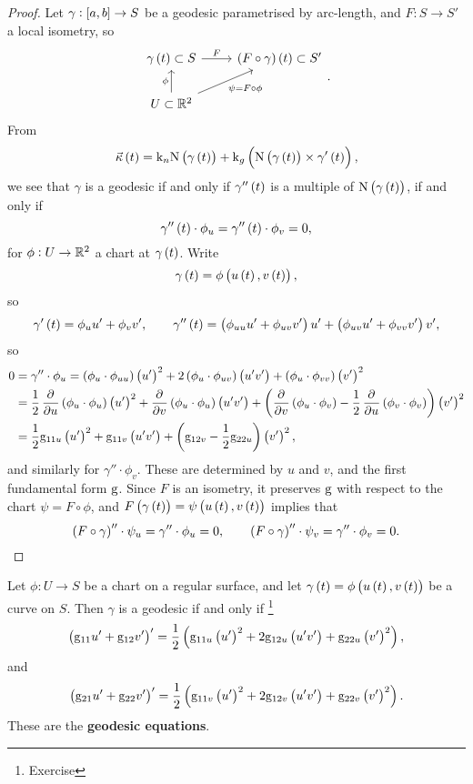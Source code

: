 \begin{proof}
Let $ \gamma : \sbr{a, b} \to S $ be a geodesic parametrised by arc-length, and $ F : S \to S' $ a local isometry, so
$$
\begin{tikzcd}
\gamma\br{t} \subset S \arrow{r}{F} & \br{F \circ \gamma}\br{t} \subset S' \\
U \subset \RR^2 \arrow{u}{\phi} \arrow{ur}[swap]{\psi = F \circ \phi}
\end{tikzcd}.
$$
From
$$ \vec{\kappa}\br{t} = \k_n\N\br{\gamma\br{t}} + \k_g\br{\N\br{\gamma\br{t}} \times \gamma'\br{t}}, $$
we see that $ \gamma $ is a geodesic if and only if $ \gamma''\br{t} $ is a multiple of $ \N\br{\gamma\br{t}} $, if and only if
$$ \gamma''\br{t} \cdot \phi_u = \gamma''\br{t} \cdot \phi_v = 0, $$
for $ \phi : U \to \mathbb{R}^2 $ a chart at $ \gamma\br{t} $. Write
$$ \gamma\br{t} = \phi\br{u\br{t}, v\br{t}}, $$
so
$$ \gamma'\br{t} = \phi_uu' + \phi_vv', \qquad \gamma''\br{t} = \br{\phi_{uu}u' + \phi_{uv}v'}u' + \br{\phi_{uv}u' + \phi_{vv}v'}v', $$
so
\begin{align*}
0
& = \gamma'' \cdot \phi_u
= \br{\phi_u \cdot \phi_{uu}}\br{u'}^2 + 2\br{\phi_u \cdot \phi_{uv}}\br{u'v'} + \br{\phi_u \cdot \phi_{vv}}\br{v'}^2 \\
& = \dfrac{1}{2}\dpd{}{u}\br{\phi_u \cdot \phi_u}\br{u'}^2 + \dpd{}{v}\br{\phi_u \cdot \phi_u}\br{u'v'} + \br{\dpd{}{v}\br{\phi_u \cdot \phi_v} - \dfrac{1}{2}\dpd{}{u}\br{\phi_v \cdot \phi_v}}\br{v'}^2 \\
& = \dfrac{1}{2}\g_{11u}\br{u'}^2 + \g_{11v}\br{u'v'} + \br{\g_{12v} - \dfrac{1}{2}\g_{22u}}\br{v'}^2,
\end{align*}
and similarly for $ \gamma'' \cdot \phi_v $. These are determined by $ u $ and $ v $, and the first fundamental form $ \mathrm{g} $. Since $ F $ is an isometry, it preserves $ \mathrm{g} $ with respect to the chart $ \psi = F \circ \phi $, and $ F\br{\gamma\br{t}} = \psi\br{u\br{t}, v\br{t}} $ implies that
$$ \br{F \circ \gamma}'' \cdot \psi_u = \gamma'' \cdot \phi_u = 0, \qquad \br{F \circ \gamma}'' \cdot \psi_v = \gamma'' \cdot \phi_v = 0. $$
\end{proof}

Let $ \phi : U \to S $ be a chart on a regular surface, and let $ \gamma\br{t} = \phi\br{u\br{t}, v\br{t}} $ be a curve on $ S $. Then $ \gamma $ is a geodesic if and only if \footnote{Exercise}
$$ \br{\g_{11}u' + \g_{12}v'}' = \dfrac{1}{2}\br{\g_{11u}\br{u'}^2 + 2\g_{12u}\br{u'v'} + \g_{22u}\br{v'}^2}, $$
and
$$ \br{\g_{21}u' + \g_{22}v'}' = \dfrac{1}{2}\br{\g_{11v}\br{u'}^2 + 2\g_{12v}\br{u'v'} + \g_{22v}\br{v'}^2}. $$
These are the \textbf{geodesic equations}.

